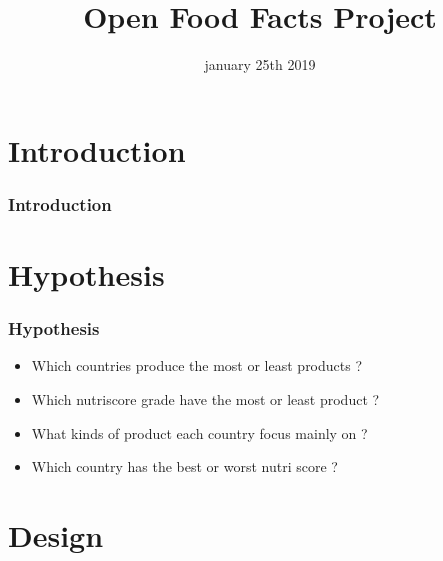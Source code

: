 \documentclass{beamer}
\begin{document}

\title{Open Food Facts Project}
\author{ } 
\date{january 25th 2019}

\maketitle

\section{Introduction}

\begin{frame}
\frametitle{Introduction}
\end{frame}

\section{Hypothesis}

\begin{frame}
\frametitle{Hypothesis}
\begin{itemize}[label=$\square$]
    \item Which countries produce the most or least products ?\pause 
    \item Which nutriscore grade have the most or least product ?\pause
    \item What kinds of product each country focus mainly on ?\pause
    \item Which country has the best or worst nutri score ?
\end{itemize}
\end{frame}

\section{Design}
\end{document}
